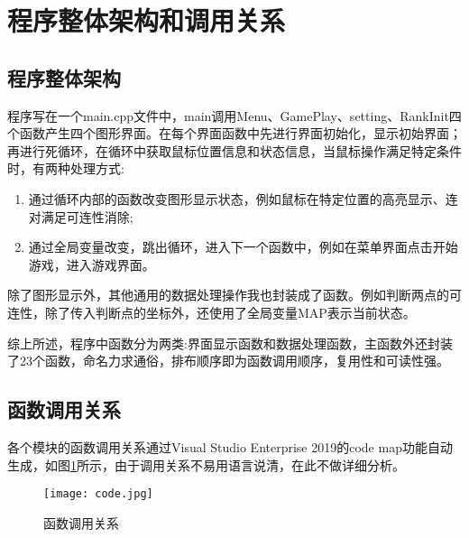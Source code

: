 \section{程序整体架构和调用关系}
\subsection{程序整体架构}
程序写在一个main.cpp文件中，main调用Menu、GamePlay、setting、RankInit四个函数产生四个图形界面。在每个界面函数中先进行界面初始化，显示初始界面；再进行死循环，在循环中获取鼠标位置信息和状态信息，当鼠标操作满足特定条件时，有两种处理方式:

\begin{enumerate}
    \item 通过循环内部的函数改变图形显示状态，例如鼠标在特定位置的高亮显示、连对满足可连性消除;
    \item 通过全局变量改变，跳出循环，进入下一个函数中，例如在菜单界面点击开始游戏，进入游戏界面。
\end{enumerate}

除了图形显示外，其他通用的数据处理操作我也封装成了函数。例如判断两点的可连性，除了传入判断点的坐标外，还使用了全局变量MAP表示当前状态。

综上所述，程序中函数分为两类:界面显示函数和数据处理函数，主函数外还封装了23个函数，命名力求通俗，排布顺序即为函数调用顺序，复用性和可读性强。

\subsection{函数调用关系}
各个模块的函数调用关系通过Visual Studio Enterprise 2019的code map功能自动生成，如图\ref{fig:code}所示，由于调用关系不易用语言说清，在此不做详细分析。
\begin{figure}[!htbp]
        \centering
        \texttt{[image: code.jpg]}
        \caption{函数调用关系} \label{fig:code}
    \end{figure}





